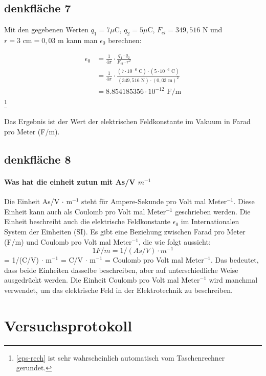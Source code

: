 \documentclass{report}
\begin{document}
\subsection{denkfläche 7}
Mit den gegebenen Werten $q_1=7\mu\text{C}$, $q_2=5\mu\text{C}$, $F_{el}=349,516\text{ N}$ und $r=3\text{ cm}=0,03\text{ m}$ kann man $\epsilon_0$ berechnen:

\begin{align}
\epsilon_0 &= \frac{1}{4\pi} \cdot \frac{q_1 \cdot q_2}{F_{el} \cdot r^2} \\
&= \frac{1}{4\pi} \cdot \frac{(7\cdot 10^{-6}\text{ C}) \cdot (5\cdot 10^{-6}\text{ C})}{(349,516\text{ N}) \cdot (0,03\text{ m})^2} \\
&= 8.854185356\cdot 10^{-12}\text{ F/m} \label{eps-rech}
\end{align}
\footnote{\ref{eps-rech} ist sehr wahrscheinlich automatisch vom Taschenrechner gerundet.}

Das Ergebnis ist der Wert der elektrischen Feldkonstante im Vakuum in Farad pro Meter (F/m).

\subsection{denkfläche 8}
\paragraph{Was hat die einheit zutun mit As/V $m^{-1}$}

Die Einheit As/V $\cdot$ m$^{-1}$ steht für Ampere-Sekunde pro Volt mal
Meter$^{-1}$. Diese Einheit kann auch als Coulomb pro Volt mal Meter$^{-1}$
geschrieben werden. Die Einheit beschreibt auch die elektrische Feldkonstante
$\epsilon_0$ im Internationalen System der Einheiten (SI).
Es gibt eine Beziehung zwischen Farad pro Meter (F/m) und Coulomb pro Volt mal
Meter$^{-1}$, die wie folgt aussieht:
$$1 F/m = 1/(As/V) \cdot m^{-1} $$ 
= 1/(C/V) $\cdot$ m$^{-1}$ = C/V $\cdot$ m$^{-1}$ = Coulomb pro Volt mal Meter$^{-1}$.
Das bedeutet, dass beide Einheiten dasselbe beschreiben, aber auf
unterschiedliche Weise ausgedrückt werden. Die Einheit Coulomb pro Volt mal
Meter$^{-1}$ wird manchmal verwendet, um das elektrische Feld in der
Elektrotechnik zu beschreiben.

\clearpage
\section{Versuchsprotokoll}
\end{document}
